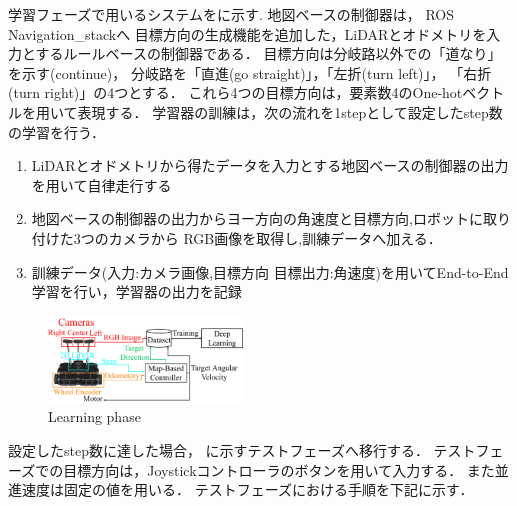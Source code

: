\documentclass[10pt]{jarticle}
\begin{document}
    学習フェーズで用いるシステムをに示す.
    地図ベースの制御器は，
    ROS Navigation\_stack\cite{navigation}へ
    目標方向の生成機能を追加した，LiDARとオドメトリを入力とするルールベースの制御器である．
    目標方向は分岐路以外での「道なり」を示す(continue)，
    分岐路を「直進(go straight)」，「左折(turn left)」，
    「右折(turn right)」の4つとする．
    これら4つの目標方向は，要素数4のOne-hotベクトルを用いて表現する．
    学習器の訓練は，次の流れを1stepとして設定したstep数の学習を行う．
    \begin{enumerate}
        \setlength{\parskip}{0cm} %
        \setlength{\itemsep}{0cm} %
        \item LiDARとオドメトリから得たデータを入力とする地図ベースの制御器の出力を用いて自律走行する
        \item 地図ベースの制御器の出力からヨー方向の角速度と目標方向,ロボットに取り付けた3つのカメラから
        RGB画像を取得し,訓練データへ加える．
        \item 訓練データ(入力:カメラ画像,目標方向 目標出力:角速度)を用いてEnd-to-End学習を行い，学習器の出力を記録
        \end{enumerate}
    \begin{center}
        \begin{figure}[h]
            \centering
            \includegraphics[width=0.46\textwidth]{./fig/system_learning.pdf}
            \caption{Learning phase}
            \label{fig:system_learning}
        \end{figure}
    \end{center}
    
    設定したstep数に達した場合，
    に示すテストフェーズへ移行する．
    テストフェーズでの目標方向は，Joystickコントローラのボタンを用いて入力する．
    また並進速度は固定の値を用いる．
    テストフェーズにおける手順を下記に示す．
    
\end{document}

